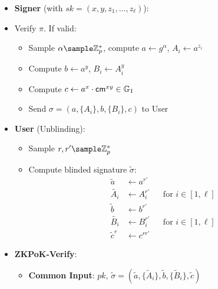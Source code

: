 {\begin{itemize}
\begin{itemize}
        \item \textbf{Signer} (with $sk = (x, y, z_1, \ldots, z_\ell)$):
        \item Verify $\pi$. If valid:
                
        \begin{itemize}
            \item Sample $\alpha \sample \Z_p^*$, compute $a \gets g^\alpha$, $A_i \gets a^{z_i}$
            \item Compute $b \gets a^y$, $B_i \gets A_i^y$
            \item Compute $c \gets a^x \cdot \mathsf{cm}^{xy} \in \mathbb{G}_1$
            \item Send $\sigma = (a, \{A_i\}, b, \{B_i\}, c)$ to User
        \end{itemize}


        \item \textbf{User} (Unblinding):
            \begin{itemize}
                \item Sample $r, r' \sample \Z_p^*$
                \item Compute blinded signature $\tilde{\sigma}$:
                    \begin{align*}
                        \tilde{a} &\gets a^{r'} \\
                        \tilde{A_i} &\gets A_i^{r'} && \text{for } i \in [1,\ell] \\
                        \tilde{b} &\gets b^{r'} \\
                        \tilde{B_i} &\gets B_i^{r'} && \text{for } i \in [1,\ell] \\
                        \tilde{c}^r &\gets c^{r r'}
                    \end{align*}
            \end{itemize}

    \item \textbf{ZKPoK-Verify}:
    \begin{itemize}
        \item \textbf{Common Input}: $pk$, $\tilde{\sigma} = (\tilde{a}, \{\tilde{A}_i\}, \tilde{b}, \{\tilde{B}_i\}, \tilde{c})$
        

\end{itemize}
\end{itemize}
\end{itemize}}
